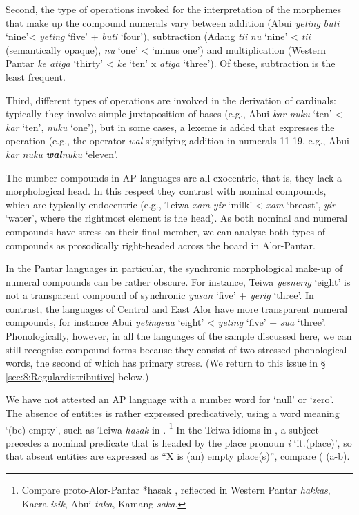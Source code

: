 Second, the type of operations invoked for the interpretation of the morphemes that make up the compound numerals vary between addition (Abui \textit{yeting} \textit{buti} `nine'{\textless} \textit{yeting} `five' + \textit{buti} `four'), subtraction (Adang  \textit{ti}\textit{{\textglotstop}}\textit{i} \textit{nu} `nine' {\textless} \textit{ti}\textit{{\textglotstop}}\textit{i} (semantically opaque), \textit{nu} `one' {\textless} `minus one') and multiplication (Western Pantar \textit{ke atiga} `thirty' {\textless} \textit{ke} `ten' x \textit{atiga} `three'). Of these, subtraction is the least frequent.

Third, different types of operations are involved in the derivation of cardinals: typically they involve simple juxtaposition of bases (e.g., Abui \textit{kar nuku} `ten' {\textless} \textit{kar} `ten', \textit{nuku} `one'), but in some cases, a lexeme is added that expresses the operation (e.g., the operator \textit{wal} signifying addition in numerals 11-19, e.g., Abui \textit{kar nuku} \textbf{\textit{wal}}\textit{nuku} `eleven'. 

The number compounds in AP languages are all exocentric, that is, they lack a morphological head. In this respect they contrast with nominal compounds, which are typically endocentric (e.g., Teiwa \textit{xam yir} `milk' {\textless} \textit{xam} `breast', \textit{yir} `water', where the rightmost element is the head). As both nominal and numeral compounds have stress on their final member, we can analyse both types of compounds as prosodically right-headed across the board in Alor-Pantar. 

In the Pantar languages in particular, the synchronic morphological make-up of numeral compounds can be rather obscure. For instance, Teiwa \textit{yesnerig} `eight' is not a transparent compound of synchronic \textit{yusan} `five' + \textit{yerig} `three'. In contrast, the languages of Central and East Alor have more transparent numeral compounds, for instance Abui \textit{yetingsua} `eight' {\textless} \textit{yeting} `five' + \textit{sua} `three'. Phonologically, however, in all the languages of the sample discussed here, we can still recognise compound forms because they consist of two stressed phonological words, the second of which has primary stress. (We return to this issue in {\S} \ref{sec:8:Regulardistributive} below.) 

We have not attested an AP language with a number word for `null' or `zero'. The absence of entities is rather expressed predicatively, using a word meaning `(be) empty', such as Teiwa \textit{hasak} in .
\footnote{Compare proto-Alor-Pantar *hasak \citep{HoltonRobinsonTVhistory}, reflected in Western Pantar \textit{hakkas}, Kaera \textit{isik}, Abui \textit{taka}, Kamang \textit{saka}.} In the Teiwa idioms in , a subject precedes a nominal predicate that is headed by the place pronoun \textit{i} `it.(place)', so that absent entities are expressed as ``X is (an) empty place(s)'', compare ( (a-b).


